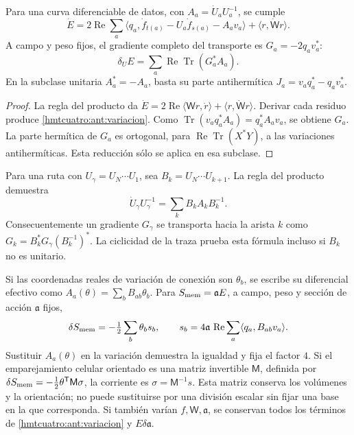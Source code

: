 \begin{proposition}
\label{hmtcuatro:ant:variacion-completa}
Para una curva diferenciable de datos, con
\(A_a=\dot U_aU_a^{-1}\), se cumple
\begin{equation}
 \dot E=2\operatorname{Re}\sum_a
 \langle q_a,\dot f_{t(a)}-U_a\dot f_{s(a)}-A_av_a\rangle
 +\langle r,\dot{\mathsf W}r\rangle .
 \label{hmtcuatro:ant:variacion}
\end{equation}
A campo y peso fijos, el gradiente completo del transporte es
\(G_a=-2q_av_a^*\):
\[
 \delta_U E=\sum_a\operatorname{Re}\operatorname{Tr}(G_a^*A_a).
\]
En la subclase unitaria \(A_a^*=-A_a\), basta su parte
antihermítica \(J_a=v_aq_a^*-q_av_a^*\).
\end{proposition}
\begin{proof}
La regla del producto da
\(\dot E=2\operatorname{Re}\langle\mathsf W r,\dot r\rangle+
\langle r,\dot{\mathsf W}r\rangle\).
Derivar cada residuo produce \eqref{hmtcuatro:ant:variacion}.
Como \(\operatorname{Tr}(v_aq_a^*A_a)=q_a^*A_av_a\), se obtiene
\(G_a\). La parte hermítica de \(G_a\) es ortogonal, para
\(\operatorname{Re}\operatorname{Tr}(X^*Y)\), a las variaciones
antihermíticas. Esta reducción sólo se aplica en esa subclase.
\end{proof}

Para una ruta con \(U_\gamma=U_N\cdots U_1\), sea
\(B_k=U_N\cdots U_{k+1}\). La regla del producto demuestra
\begin{equation}
 \dot U_\gamma U_\gamma^{-1}
 =\sum_k B_kA_kB_k^{-1}.
 \label{hmtcuatro:ant:variacion-ruta}
\end{equation}
Consecuentemente un gradiente \(G_\gamma\) se transporta hacia
la arista \(k\) como
\(G_k=B_k^*G_\gamma(B_k^{-1})^*\). La ciclicidad de la traza
prueba esta fórmula incluso si \(B_k\) no es unitario.

Si las coordenadas reales de variación de conexión son
\(\theta_b\), se escribe su diferencial efectivo como
\(A_a(\theta)=\sum_b B_{ab}\theta_b\). Para
\(S_{\rm mem}=\mathfrak a E\), a campo, peso y sección de acción
\(\mathfrak a\) fijos,
\begin{equation}
 \delta S_{\rm mem}=-\tfrac12\sum_b\theta_b s_b,\qquad
 s_b=4\mathfrak a\,\operatorname{Re}
          \sum_a\langle q_a,B_{ab}v_a\rangle .
 \label{hmtcuatro:ant:corriente-celular}
\end{equation}
Sustituir \(A_a(\theta)\) en la variación demuestra la igualdad
y fija el factor \(4\). Si el emparejamiento celular orientado es
una matriz invertible \(\mathsf M\), definida por
\(\delta S_{\rm mem}=-\frac12\theta^{\mathsf T}\mathsf M\sigma\),
la corriente es \(\sigma=\mathsf M^{-1}s\). Esta matriz conserva
los volúmenes y la orientación; no puede sustituirse por una
división escalar sin fijar una base en la que corresponda.
Si también varían \(f,\mathsf W,\mathfrak a\), se conservan todos
los términos de \eqref{hmtcuatro:ant:variacion} y \(E\delta\mathfrak a\).

